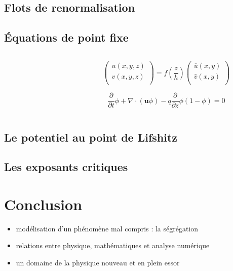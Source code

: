 \documentclass[xcolor=dvipsnames]{beamer}
\newcommand{\p}[2]{\ensuremath{\frac{\partial {#1}}{\partial {#2}}}}
\begin{document}
\subsection{Flots de renormalisation}
\begin{frame}


\end{frame}

\subsection{Équations de point fixe}
\begin{frame}

\begin{columns}

\begin{column}{6cm}


\par

\end{column}

\begin{column}{6cm}


{

\[
		\begin{pmatrix}
	u(x, y, z)\\
	v(x, y, z)\\
\end{pmatrix}
=
f \left( \frac{z}{h} \right)
\begin{pmatrix}
	\bar u(x, y) \\
	\bar v(x, y) \\
\end{pmatrix}
\]

\[
	\p{}{t} \phi + \nabla \cdot ( \mathbf{u} \phi )  - q \p{}{z} \phi( 1 - \phi) = 0
\]

}

\end{column}

\end{columns}

\end{frame}

\subsection{Le potentiel au point de Lifshitz}

\subsection{Les exposants critiques}

\section{Conclusion}
\begin{frame}

\begin{itemize}
\item modélisation d'un phénomène mal compris : la ségrégation
\item relations entre physique, mathématiques et analyse numérique 
\item un domaine de la physique nouveau et en plein essor
\end{itemize}

\end{frame}
\end{document}
